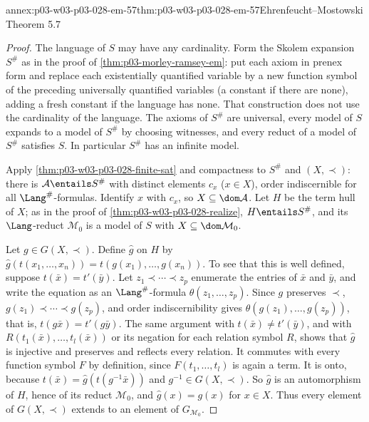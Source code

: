 \begin{annexitem}{annex:p03-w03-p03-028-em-57}{thm:p03-w03-p03-028-em-57}{Ehrenfeucht--Mostowski Theorem 5.7}
\begin{proof}
The language of \(S\) may have any cardinality.  Form the Skolem expansion
\(S^{\#}\) as in the proof of \cref{thm:p03-morley-ramsey-em}: put each
axiom in prenex form and replace each existentially quantified variable by
a new function symbol of the preceding universally quantified variables (a
constant if there are none), adding a fresh constant if the language has
none.  That construction does not use the cardinality of the language.
The axioms of \(S^{\#}\) are universal, every model of \(S\) expands to a
model of \(S^{\#}\) by choosing witnesses, and every reduct of a model of
\(S^{\#}\) satisfies \(S\).  In particular \(S^{\#}\) has an infinite
model.

Apply \cref{thm:p03-w03-p03-028-finite-sat} and compactness to \(S^{\#}\)
and \((X,\prec)\): there is \(\mathcal A\entails S^{\#}\) with distinct
elements \(c_x\) (\(x\in X\)), order indiscernible for all
\(\Lang^{\#}\)-formulas.  Identify \(x\) with \(c_x\), so
\(X\subseteq\dom\mathcal A\).  Let \(H\) be the term hull of \(X\); as in
the proof of \cref{thm:p03-w03-p03-028-realize}, \(H\entails S^{\#}\), and
its \(\Lang\)-reduct \(\mathcal M_0\) is a model of \(S\) with
\(X\subseteq\dom\mathcal M_0\).

Let \(g\in G(X,\prec)\).  Define \(\hat g\) on \(H\) by
\(\hat g(t(x_1,\ldots,x_n))=t(g(x_1),\ldots,g(x_n))\).  To see that this is
well defined, suppose \(t(\bar x)=t'(\bar y)\).  Let \(z_1\prec\cdots\prec
z_p\) enumerate the entries of \(\bar x\) and \(\bar y\), and write the
equation as an \(\Lang^{\#}\)-formula \(\theta(z_1,\ldots,z_p)\).  Since
\(g\) preserves \(\prec\), \(g(z_1)\prec\cdots\prec g(z_p)\), and order
indiscernibility gives \(\theta(g(z_1),\ldots,g(z_p))\), that is,
\(t(g\bar x)=t'(g\bar y)\).  The same argument with
\(t(\bar x)\neq t'(\bar y)\), and with
\(R(t_1(\bar x),\ldots,t_l(\bar x))\) or its negation for each relation
symbol \(R\), shows that \(\hat g\) is injective and preserves and reflects
every relation.  It commutes with every function symbol \(F\) by
definition, since \(F(t_1,\ldots,t_l)\) is again a term.  It is onto,
because \(t(\bar x)=\hat g(t(g^{-1}\bar x))\) and \(g^{-1}\in
G(X,\prec)\).  So \(\hat g\) is an automorphism of \(H\), hence of its
reduct \(\mathcal M_0\), and \(\hat g(x)=g(x)\) for \(x\in X\).  Thus every
element of \(G(X,\prec)\) extends to an element of
\(G_{\mathcal M_0}\).


\end{proof}
\end{annexitem}
